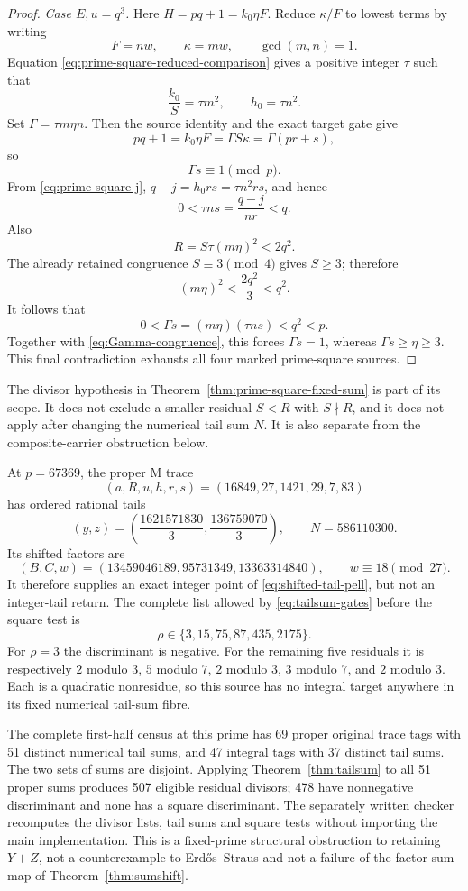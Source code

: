 \begin{proof}
\emph{Case $E,u=q^3$.}
Here $H=pq+1=k_0\eta F$.  Reduce $\kappa/F$ to lowest terms by writing
\[
 F=nw,\qquad \kappa=mw,\qquad \gcd(m,n)=1.
\]
Equation \eqref{eq:prime-square-reduced-comparison} gives a positive integer
$\tau$ such that
\[
 \frac{k_0}{S}=\tau m^2,\qquad h_0=\tau n^2.
\]
Set $\Gamma=\tau m\eta n$.  Then the source identity and the exact target
gate give
\[
 pq+1=k_0\eta F
 =\Gamma S\kappa
 =\Gamma(pr+s),
\]
so
\begin{equation}\label{eq:Gamma-congruence}
 \Gamma s\equiv1\pmod p.
\end{equation}
From \eqref{eq:prime-square-j},
$q-j=h_0rs=\tau n^2rs$, and hence
\[
 0<\tau ns=\frac{q-j}{nr}<q.
\]
Also
\[
 R=S\tau(m\eta)^2<2q^2.
\]
The already retained congruence $S\equiv3\pmod4$ gives $S\ge3$; therefore
\[
 (m\eta)^2<\frac{2q^2}{3}<q^2.
\]
It follows that
\[
 0<\Gamma s=(m\eta)(\tau ns)<q^2<p.
\]
Together with \eqref{eq:Gamma-congruence}, this forces $\Gamma s=1$, whereas
$\Gamma s\ge\eta\ge3$.  This final contradiction exhausts all four marked
prime-square sources.
\end{proof}

The divisor hypothesis in Theorem~\ref{thm:prime-square-fixed-sum} is part
of its scope.  It does not exclude a smaller residual $S<R$ with
$S\nmid R$, and it does not apply after changing the numerical tail sum
$N$.  It is also separate from the composite-carrier obstruction below.

At $p=67369$, the proper M trace
\[
 (a,R,u,h,r,s)=(16849,27,1421,29,7,83)
\]
has ordered rational tails
\[
 (y,z)=\left(\frac{1621571830}{3},\frac{136759070}{3}\right),\qquad
 N=586110300.
\]
Its shifted factors are
\[
 (B,C,w)=(13459046189,95731349,13363314840),\qquad
 w\equiv18\pmod{27}.
\]
It therefore supplies an exact integer point of
\eqref{eq:shifted-tail-pell}, but not an integer-tail return.  The complete
list allowed by \eqref{eq:tailsum-gates} before the square test is
\[
 \rho\in\{3,15,75,87,435,2175\}.
\]
For $\rho=3$ the discriminant is negative.  For the remaining five residuals
it is respectively $2$ modulo $3$, $5$ modulo $7$, $2$ modulo $3$, $3$
modulo $7$, and $2$ modulo $3$.  Each is a quadratic nonresidue, so this
source has no integral target anywhere in its fixed numerical tail-sum fibre.

The complete first-half census at this prime has 69 proper original trace tags
with 51 distinct numerical tail sums, and 47 integral tags with 37 distinct
tail sums.  The two sets of sums are disjoint.  Applying
Theorem~\ref{thm:tailsum} to all 51 proper sums produces 507 eligible residual
divisors; 478 have nonnegative discriminant and none has a square
discriminant.  The separately written checker recomputes the divisor lists,
tail sums and square tests without importing the main implementation.  This is
a fixed-prime structural obstruction to retaining $Y+Z$, not a counterexample
to Erd\H{o}s--Straus and not a failure of the factor-sum map of
Theorem~\ref{thm:sumshift}.

